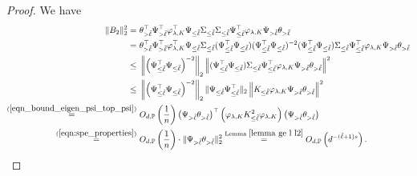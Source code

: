 \documentclass{article}
\theoremstyle{plain}
\theoremstyle{definition}
\theoremstyle{remark}
\begin{document}
\begin{appendix}
\begin{proof}
We have
\begin{equation}\label{eqn_bound_B_2_spe}
    \begin{aligned}
                \|B_2\|_{2}^{2} 
=&~  
\theta_{>\tilde{\ell}}^\top \Psi_{>\tilde{\ell}}^\top \varphi_{\lambda, K} ^\top
\Psi_{\leq \tilde{\ell}} 
\Sigma_{\leq \tilde{\ell}} 
{\Sigma_{\leq \tilde{\ell}} \Psi^{\top}_{\leq \tilde{\ell}} \varphi_{\lambda, K} \Psi_{>\tilde{\ell}} \theta_{>\tilde{\ell}}}
                 \\
=&~ \theta_{>\tilde{\ell}}^\top \Psi_{>\tilde{\ell}}^\top \varphi_{\lambda, K} ^\top
\Psi_{\leq \tilde{\ell}} 
\Sigma_{\leq \tilde{\ell}} 
(\Psi_{\leq \tilde{\ell}}^\top \Psi_{\leq \tilde{\ell}} ) (\Psi_{\leq \tilde{\ell}}^\top \Psi_{\leq \tilde{\ell}} )^{-2}(\Psi_{\leq \tilde{\ell}}^\top \Psi_{\leq \tilde{\ell}} ) 
{\Sigma_{\leq \tilde{\ell}} \Psi^{\top}_{\leq \tilde{\ell}} \varphi_{\lambda, K} \Psi_{>\tilde{\ell}} \theta_{>\tilde{\ell}}}                 
                 \\
                \leq &~ \left\|\left(\Psi_{\leq \tilde{\ell}}^\top \Psi_{\leq \tilde{\ell}} \right)^{-2}\right\|_2 
                \left\|(\Psi_{\leq \tilde{\ell}}^\top \Psi_{\leq \tilde{\ell}} ) 
{\Sigma_{\leq \tilde{\ell}} \Psi^{\top}_{\leq \tilde{\ell}} \varphi_{\lambda, K} \Psi_{>\tilde{\ell}} \theta_{>\tilde{\ell}}}   \right\|^2 
               \\
                \leq &~ \left\|\left(\Psi_{\leq \tilde{\ell}}^\top \Psi_{\leq \tilde{\ell}} \right)^{-2}\right\|_2 \|\Psi_{\leq \tilde{\ell}}\Psi_{\leq \tilde{\ell}}^\top \|_2
                \left\|K_{\leq \tilde{\ell}} \varphi_{\lambda, K} \Psi_{>\tilde{\ell}} \theta_{>\tilde{\ell}} \right\|^2    \\ \overset{(\ref{eqn_bound_eigen_psi_top_psi})}{=}
                &~ 
             O_{d, \mathbb{P}}\left(\frac{1}{n}\right)\left( \Psi_{>\tilde{\ell}} \theta_{>\tilde{\ell}}  \right)^{\top} \left( \varphi_{\lambda, K} K_{\leq \tilde{\ell}}^2   \varphi_{\lambda, K}  \right) \left( \Psi_{>\tilde{\ell}} \theta_{>\tilde{\ell}}  \right)\\
             \overset{(\ref{eqn:spe_properties})}{=}&~
             O_{d, \mathbb{P}} \left( \frac{1}{n} \right) \cdot \|\Psi_{>\tilde{\ell}} \theta_{>\tilde{\ell}} \|_{2}^{2}
            \overset{\text{Lemma } \ref{lemma ge l l2}}{=}
            O_{d, \mathbb{P}}\left(  d^{-(\tilde{\ell}+1)s}\right).
    \end{aligned}
\end{equation}


\end{proof}
\end{appendix}
\end{document}
